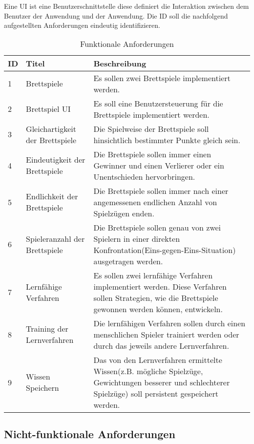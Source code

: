 Eine \ac{UI} ist eine Benutzerschnittstelle diese definiert die Interaktion zwischen dem Benutzer der Anwendung und der Anwendung. Die \ac{ID} soll die nachfolgend aufgestellten Anforderungen eindeutig identifizieren.

\begin{table}
\caption{Funktionale Anforderungen}
\begin{tabular}{ | p{} | p{} | p{} |}
\hline
\ac{ID} & Titel & Beschreibung \\ \hline
1 & Brettspiele & Es sollen zwei Brettspiele implementiert werden. \\ \hline
2 & Brettspiel \ac{UI} &  Es soll eine Benutzersteuerung für die Brettspiele implementiert werden. \\ \hline
3 & Gleichartigkeit der Brettspiele & Die Spielweise der Brettspiele soll hinsichtlich bestimmter Punkte gleich sein. \\ \hline
4 & Eindeutigkeit der Brettspiele & Die Brettspiele sollen immer einen Gewinner und einen Verlierer oder ein Unentschieden hervorbringen. \\ \hline
5 & Endlichkeit der Brettspiele & Die Brettspiele sollen immer nach einer angemessenen endlichen Anzahl von Spielzügen enden. \\ \hline
6 & Spieleranzahl der Brettspiele & Die Brettspiele sollen genau von zwei Spielern in einer direkten Konfrontation(Eins-gegen-Eins-Situation) ausgetragen werden. \\ \hline
7 & Lernfähige Verfahren & Es sollen zwei lernfähige Verfahren implementiert werden. Diese Verfahren sollen Strategien, wie die Brettspiele gewonnen werden können, entwickeln. \\ \hline
8 & Training der Lernverfahren & Die lernfähigen Verfahren sollen durch einen menschlichen Spieler trainiert werden oder durch das jeweils andere Lernverfahren. \\ \hline
9 & Wissen Speichern & Das von den Lernverfahren ermittelte Wissen(z.B. mögliche Spielzüge, Gewichtungen besserer und schlechterer Spielzüge) soll persistent gespeichert werden. \\ \hline
\end{tabular}
\label{tab:funktionale_anforderungen}
\end{table}

\subsection{Nicht-funktionale Anforderungen}

